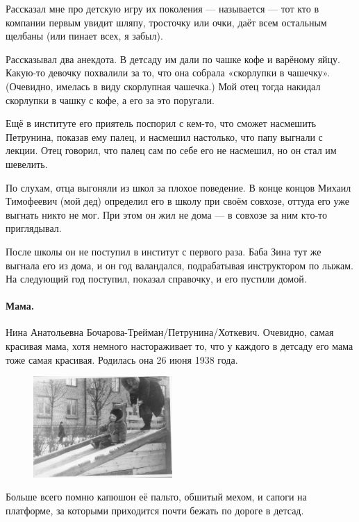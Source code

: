 \documentclass{book}
\begin{document}
Рассказал мне про детскую игру их поколения --- называется  --- тот кто в компании первым увидит шляпу, тросточку или очки, даёт всем остальным щелбаны (или пинает всех, я забыл).

Рассказывал два анекдота.
В детсаду им дали по чашке кофе и варёному яйцу.
Какую-то девочку похвалили за то, что она собрала «скорлупки в чашечку».
(Очевидно, имелась в виду скорлупная чашечка.)
Мой отец тогда накидал скорлупки в чашку с кофе, а его за это поругали.

Ещё в институте его приятель поспорил с кем-то, что сможет насмешить Петрунина, показав ему палец, и насмешил настолько, что папу выгнали с лекции.
Отец говорил, что палец сам по себе его не насмешил, но он стал им шевелить.

По слухам, отца выгоняли из школ за плохое поведение.
В конце концов Михаил Тимофеевич (мой дед) определил его в школу при своём совхозе, оттуда его уже выгнать никто не мог.
При этом он жил не дома --- в совхозе за ним кто-то приглядывал.

После школы он не поступил в институт с первого раза.
Баба Зина тут же выгнала его из дома, и он год валандался, подрабатывая инструктором по лыжам.
На следующий год поступил, показал справочку, и его пустили домой.

\paragraph{Мама.}  Нина Анатольевна Бочарова-Трейман/Петрунина/Хоткевич.
Очевидно, самая красивая мама,
хотя немного настораживает то, что у каждого в детсаду его мама тоже самая красивая.
Родилась она 26 июня 1938 года.


\begin{figure}
\vskip-0mm
\centering
\includegraphics[width=53mm,angle=0]{pics/tosha-mama-detsad}
\end{figure}

Больше всего помню капюшон её пальто, обшитый мехом, и 
сапоги на платформе, за которыми приходится почти бежать по дороге в детсад.
\end{document}
